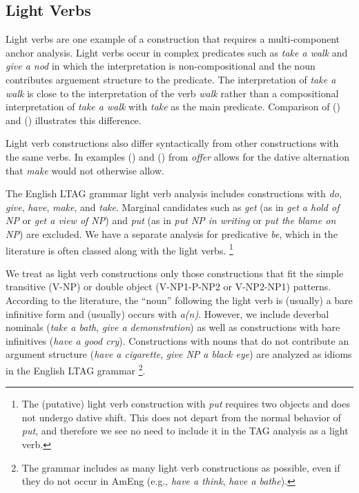 

\subsection{Light Verbs}

Light verbs are one example of a construction that requires a
multi-component anchor analysis. Light verbs occur in complex
predicates such as {\it take a walk} and {\it give a nod} in which the
interpretation is non-compositional and the noun contributes arguement
structure to the predicate. The interpretation of {\it take a walk}
is close to the interpretation of the verb {\it walk} rather than a
compositional interpretation of {\it take a walk} with {\it take} as
the main predicate. Comparison of () and () illustrates
this difference.


Light verb constructions also differ syntactically from other
constructions with the same verbs. In examples () and () from \cite{Cattell84} {\it offer} allows for the dative alternation that {\it make} would not otherwise allow.



The English LTAG grammar light verb analysis includes constructions with {\it do}, {\it
give}, {\it have}, {\it make}, and {\it take}.  Marginal candidates such as
{\it get} (as in {\it get a hold of NP} or {\it get a view of NP}) and {\it
put} (as in {\it put NP in writing} or {\it put the blame on NP}) are
excluded.  We have a separate analysis for predicative {\it be}, which in
the literature is often classed along with the light verbs.
\footnote{The (putative) light verb construction with {\it put} requires
two objects and does not undergo dative shift.  This does not depart from
the normal behavior of {\it put}, and therefore we see no need to include
it in the TAG analysis as a light verb.}

We treat as light verb constructions only those constructions that fit
the simple transitive (V-NP) or double object (V-NP1-P-NP2 or
V-NP2-NP1) patterns.  According to the literature, the ``noun''
following the light verb is (usually) a bare infinitive form and
(usually) occurs with {\it a(n)}.  However, we include deverbal
nominals ({\it take a bath}, {\it give a demonstration}) as well as
constructions with bare infinitives ({\it have a good cry}).
Constructions with nouns that do not contribute an argument structure
({\it have a cigarette}, {\it give NP a black eye}) are analyzed as
idioms in the English LTAG grammar \footnote{The grammar includes as many light verb
constructions as possible, even if they do not occur in AmEng (e.g., {\it
have a think}, {\it have a bathe}).}.

